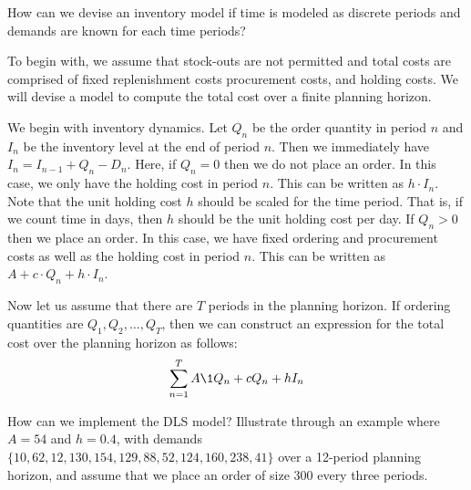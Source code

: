 \begin{question}
How can we devise an inventory model if time is modeled as discrete periods and demands are known for each time periods?
\end{question}

\begin{solution}
To begin with, we assume that stock-outs are not permitted and total costs are comprised of fixed replenishment costs procurement costs, and holding costs. We will devise a model to compute the total cost over a finite planning horizon.

We begin with inventory dynamics. Let $Q_n$ be the order quantity in period $n$ and $I_n$ be the inventory level at the end of period $n$. Then we immediately have $I_n=I_{n-1}+Q_n-D_n$. Here, if $Q_n=0$ then we do not place an order. In this case, we only have the holding cost in period $n$. This can be written as $h\cdot I_n$. Note that the unit holding cost $h$ should be scaled for the time period. That is, if we count time in days, then $h$ should be the unit holding cost per day. If $Q_n>0$ then we place an order. In this case, we have fixed ordering and procurement costs as well as the holding cost in period $n$. This can be written as $A+c\cdot Q_n+h\cdot I_n$.

Now let us assume that there are $T$ periods in the planning horizon. If ordering quantities are $Q_1,Q_2,\ldots,Q_T$, then we can construct an expression for the total cost over the planning horizon as follows:
\begin{align*}
\sum_{n=1}^T A \1{Q_n} + c Q_n + hI_n
\end{align*}
\end{solution}

\begin{question}
How can we implement the DLS model? Illustrate through an example where $A=54$ and $h=0.4$, with demands $\{10,62,12,130,154,129,88,52,124,160,238,41\}$ over a 12-period planning horizon, and assume that we place an order of size 300 every three periods. 
\end{question}

